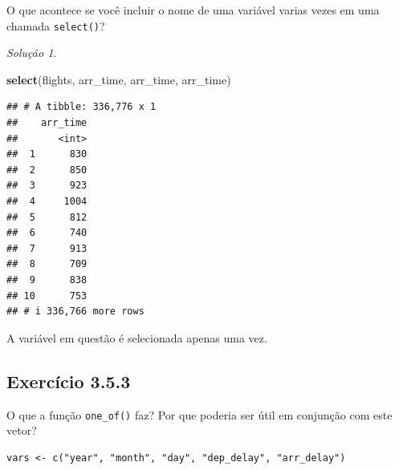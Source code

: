 \documentclass[
]{latex/krantz}
\newenvironment{Shaded}{\begin{snugshade}}{\end{snugshade}}
\newcommand{\FunctionTok}[1]{\textcolor[rgb]{0.13,0.29,0.53}{\textbf{#1}}}
\newcommand{\NormalTok}[1]{#1}
\theoremstyle{definition}
\theoremstyle{definition}
\theoremstyle{definition}
\theoremstyle{definition}
\theoremstyle{remark}
\newtheorem*{solution}{Solução}
\begin{document}
O que acontece se você incluir o nome de uma variável varias vezes em uma chamada \texttt{select()}?

\begin{solution}
\leavevmode

\begin{Shaded}
\begin{Highlighting}[]
\FunctionTok{select}\NormalTok{(flights, arr\_time, arr\_time, arr\_time)}
\end{Highlighting}
\end{Shaded}

\begin{verbatim}
## # A tibble: 336,776 x 1
##    arr_time
##       <int>
##  1      830
##  2      850
##  3      923
##  4     1004
##  5      812
##  6      740
##  7      913
##  8      709
##  9      838
## 10      753
## # i 336,766 more rows
\end{verbatim}

A variável em questão é selecionada apenas uma vez.

\end{solution}

\hypertarget{exr3-5-3}{%
\subsection*{Exercício 3.5.3}\label{exr3-5-3}}

O que a função \texttt{one\_of()} faz? Por que poderia ser útil em conjunção com este vetor?

\begin{verbatim}
vars <- c("year", "month", "day", "dep_delay", "arr_delay")
\end{verbatim}
\end{document}
